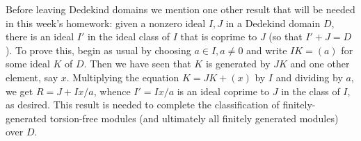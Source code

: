 Before leaving Dedekind domains we mention one other result that will be needed in this week's homework:  given a nonzero ideal $I,J$ in a Dedekind domain $D$, there is an ideal $I'$ in the ideal class of $I$ that is coprime to $J$ (so that $I'+J = D$).  To prove this, begin as usual by choosing
$a\in I, a\ne0$ and write $IK = (a)$ for some ideal $K$ of $D$.  Then we have seen that $K$ is generated by $JK$ and one other element, say $x$.  Multiplying the equation $K = JK + (x)$ by $I$ and dividing by $a$, we get $R = J + Ix/a$, whence $I' = Ix/a$ is an ideal coprime to $J$ in the class of $I$, as desired.  This result is needed to complete the classification of finitely-generated torsion-free modules (and ultimately all finitely generated modules) over $D$.

